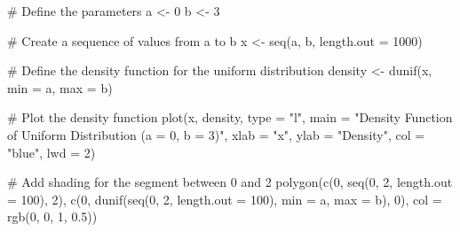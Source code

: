 # Define the parameters
a <- 0
b <- 3

# Create a sequence of values from a to b
x <- seq(a, b, length.out = 1000)

# Define the density function for the uniform distribution
density <- dunif(x, min = a, max = b)

# Plot the density function
plot(x, density, type = "l", main = "Density Function of Uniform Distribution (a = 0, b = 3)",
     xlab = "x", ylab = "Density", col = "blue", lwd = 2)

# Add shading for the segment between 0 and 2
polygon(c(0, seq(0, 2, length.out = 100), 2), c(0, dunif(seq(0, 2, length.out = 100), min = a, max = b), 0), 
        col = rgb(0, 0, 1, 0.5))

